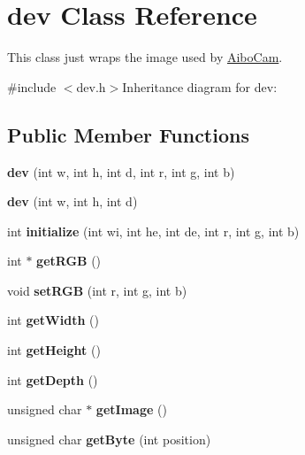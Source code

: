\hypertarget{classdev}{
\section{dev Class Reference}
\label{classdev}
}


This class just wraps the image used by \hyperlink{classAiboCam}{AiboCam}.  


{\ttfamily \#include $<$dev.h$>$}Inheritance diagram for dev:\subsection*{Public Member Functions}
\begin{DoxyCompactItemize}
\item 
\hypertarget{classdev_a1528dde7e946aea9efeb5c25ff163af9}{
{\bfseries dev} (int w, int h, int d, int r, int g, int b)}
\label{classdev_a1528dde7e946aea9efeb5c25ff163af9}

\item 
\hypertarget{classdev_adf38a65aa0df77c0c58fb7a35bf57f2e}{
{\bfseries dev} (int w, int h, int d)}
\label{classdev_adf38a65aa0df77c0c58fb7a35bf57f2e}

\item 
\hypertarget{classdev_aea51d02a9f5c04fdacc63b415d7fba6f}{
int {\bfseries initialize} (int wi, int he, int de, int r, int g, int b)}
\label{classdev_aea51d02a9f5c04fdacc63b415d7fba6f}

\item 
\hypertarget{classdev_affbd3c6d38407a67260b0805a2a996ba}{
int $\ast$ {\bfseries getRGB} ()}
\label{classdev_affbd3c6d38407a67260b0805a2a996ba}

\item 
\hypertarget{classdev_aae6a7a4192d0bf1090456d8fa5d27a09}{
void {\bfseries setRGB} (int r, int g, int b)}
\label{classdev_aae6a7a4192d0bf1090456d8fa5d27a09}

\item 
\hypertarget{classdev_adc3b057042e6069d8e2432c48418c173}{
int {\bfseries getWidth} ()}
\label{classdev_adc3b057042e6069d8e2432c48418c173}

\item 
\hypertarget{classdev_a760161504ea05e090293aff31c834634}{
int {\bfseries getHeight} ()}
\label{classdev_a760161504ea05e090293aff31c834634}

\item 
\hypertarget{classdev_a676db2fb79a8b6ddf21527aafa44ddab}{
int {\bfseries getDepth} ()}
\label{classdev_a676db2fb79a8b6ddf21527aafa44ddab}

\item 
\hypertarget{classdev_accda40f66947d00bc9fd294f47a187f6}{
unsigned char $\ast$ {\bfseries getImage} ()}
\label{classdev_accda40f66947d00bc9fd294f47a187f6}

\item 
\hypertarget{classdev_a220ca2f10395d25b828e9d5e72feefb7}{
unsigned char {\bfseries getByte} (int position)}
\label{classdev_a220ca2f10395d25b828e9d5e72feefb7}

\end{DoxyCompactItemize}

